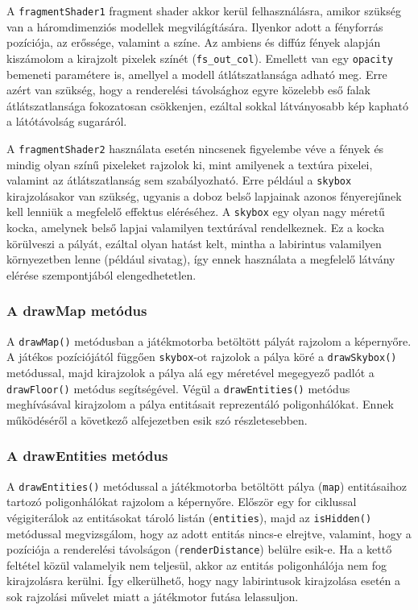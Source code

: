 A \verb|fragmentShader1| fragment shader akkor kerül felhasználásra, amikor szükség van a háromdimenziós modellek megvilágítására. Ilyenkor adott a fényforrás pozíciója, az erőssége, valamint a színe. Az ambiens és diffúz fények alapján kiszámolom a kirajzolt pixelek színét (\verb|fs_out_col|). Emellett van egy \verb|opacity| bemeneti paramétere is, amellyel a modell átlátszatlansága adható meg. Erre azért van szükség, hogy a renderelési távolsághoz egyre közelebb eső falak átlátszatlansága fokozatosan csökkenjen, ezáltal sokkal látványosabb kép kapható a látótávolság sugaráról.

A \verb|fragmentShader2| használata esetén nincsenek figyelembe véve a fények és mindig olyan színű pixeleket rajzolok ki, mint amilyenek a textúra pixelei, valamint az átlátszatlanság sem szabályozható. Erre például a \verb|skybox| kirajzolásakor van szükség, ugyanis a doboz belső lapjainak azonos fényerejűnek kell lenniük a megfelelő effektus eléréséhez. A \verb|skybox| egy olyan nagy méretű kocka, amelynek belső lapjai valamilyen textúrával rendelkeznek. Ez a kocka körülveszi a pályát, ezáltal olyan hatást kelt, mintha a labirintus valamilyen környezetben lenne (például sivatag), így ennek használata a megfelelő látvány elérése szempontjából elengedhetetlen.

\subsubsection{A drawMap metódus}

A \verb|drawMap()| metódusban a játékmotorba betöltött pályát rajzolom a képernyőre. A játékos pozíciójától függően \verb|skybox|-ot rajzolok a pálya köré a \verb|drawSkybox()| metódussal, majd kirajzolok a pálya alá egy méretével megegyező padlót a \verb|drawFloor()| metódus segítségével. Végül a \verb|drawEntities()| metódus meghívásával kirajzolom a pálya entitásait reprezentáló poligonhálókat. Ennek működéséről a következő alfejezetben esik szó részletesebben.

\subsubsection{A drawEntities metódus}

A \verb|drawEntities()| metódussal a játékmotorba betöltött pálya (\verb|map|) entitásaihoz tartozó poligonhálókat rajzolom a képernyőre. Először egy for ciklussal végigiterálok az entitásokat tároló listán (\verb|entities|), majd az \verb|isHidden()| metódussal megvizsgálom, hogy az adott entitás nincs-e elrejtve, valamint, hogy a pozíciója a renderelési távolságon (\verb|renderDistance|) belülre esik-e. Ha a kettő feltétel közül valamelyik nem teljesül, akkor az entitás poligonhálója nem fog kirajzolásra kerülni. Így elkerülhető, hogy nagy labirintusok kirajzolása esetén a sok rajzolási művelet miatt a játékmotor futása lelassuljon.

